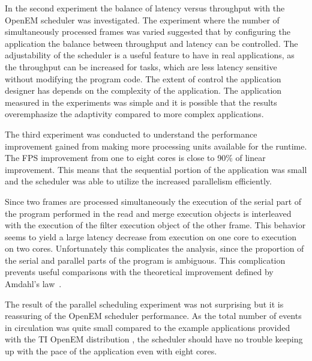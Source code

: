 In the second experiment the balance of latency versus throughput with the OpenEM scheduler was investigated. The experiment where the number of simultaneously processed frames was varied suggested that by configuring the application the balance between throughput and latency can be controlled. The adjustability of the scheduler is a useful feature to have in real applications, as the throughput can be increased for tasks, which are less latency sensitive without modifying the program code. The extent of control the application designer has depends on the complexity of the application. The application measured in the experiments was simple and it is possible that the results overemphasize the adaptivity compared to more complex applications.

The third experiment was conducted to understand the performance improvement gained from making more processing units available for the runtime. The FPS improvement from one to eight cores is close to 90\% of linear improvement. This means that the sequential portion of the application was small and the scheduler was able to utilize the increased parallelism efficiently.

Since two frames are processed simultaneously the execution of the serial part of the program performed in the read and merge execution objects is interleaved with the execution of the filter execution object of the other frame. This behavior seems to yield a large latency decrease from execution on one core to execution on two cores. Unfortunately this complicates the analysis, since the proportion of the serial and parallel parts of the program is ambiguous. This complication prevents useful comparisons with the theoretical improvement defined by Amdahl's law~\cite{amdahl1967validity}.

The result of the parallel scheduling experiment was not surprising but it is reassuring of the OpenEM scheduler performance. As the total number of events in circulation was quite small compared to the example applications provided with the TI OpenEM distribution \cite{openemuser}, the scheduler should have no trouble keeping up with the pace of the application even with eight cores.

